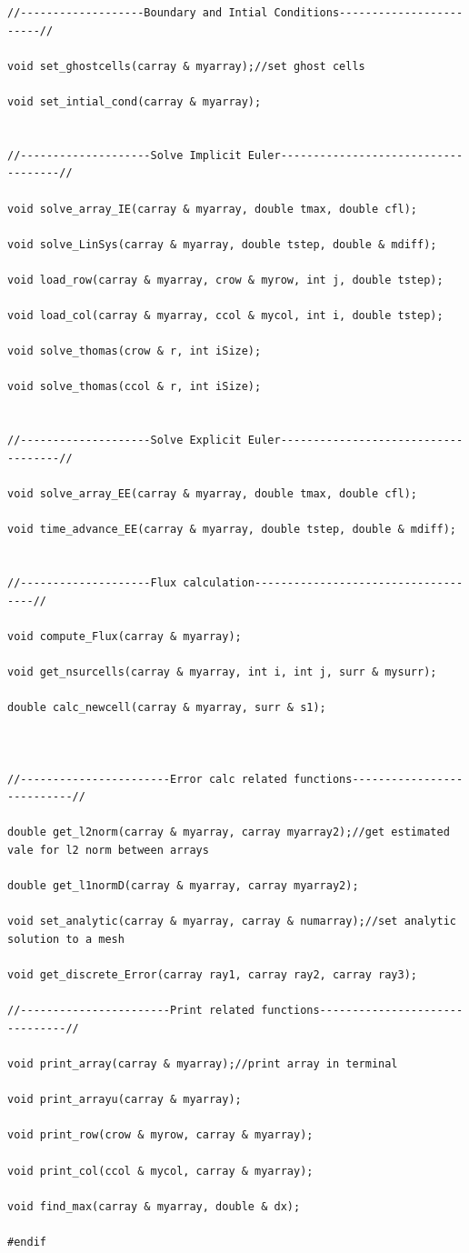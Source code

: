 \documentclass[paper=a4, fontsize=11pt, abstract=on]{scrartcl}
\numberwithin{equation}{section}		%
\numberwithin{figure}{section}			%
\numberwithin{table}{section}				%
\begin{document}
\begin{lstlisting}
//-------------------Boundary and Intial Conditions------------------------//

void set_ghostcells(carray & myarray);//set ghost cells

void set_intial_cond(carray & myarray);


//--------------------Solve Implicit Euler------------------------------------//

void solve_array_IE(carray & myarray, double tmax, double cfl);

void solve_LinSys(carray & myarray, double tstep, double & mdiff);

void load_row(carray & myarray, crow & myrow, int j, double tstep);

void load_col(carray & myarray, ccol & mycol, int i, double tstep);

void solve_thomas(crow & r, int iSize);

void solve_thomas(ccol & r, int iSize);


//--------------------Solve Explicit Euler------------------------------------//

void solve_array_EE(carray & myarray, double tmax, double cfl);

void time_advance_EE(carray & myarray, double tstep, double & mdiff);


//--------------------Flux calculation------------------------------------//

void compute_Flux(carray & myarray);

void get_nsurcells(carray & myarray, int i, int j, surr & mysurr);

double calc_newcell(carray & myarray, surr & s1);



//-----------------------Error calc related functions---------------------------//

double get_l2norm(carray & myarray, carray myarray2);//get estimated vale for l2 norm between arrays

double get_l1normD(carray & myarray, carray myarray2);

void set_analytic(carray & myarray, carray & numarray);//set analytic solution to a mesh

void get_discrete_Error(carray ray1, carray ray2, carray ray3);

//-----------------------Print related functions-------------------------------//

void print_array(carray & myarray);//print array in terminal

void print_arrayu(carray & myarray);

void print_row(crow & myrow, carray & myarray);

void print_col(ccol & mycol, carray & myarray);

void find_max(carray & myarray, double & dx);

#endif

\end{lstlisting}
\end{document}
